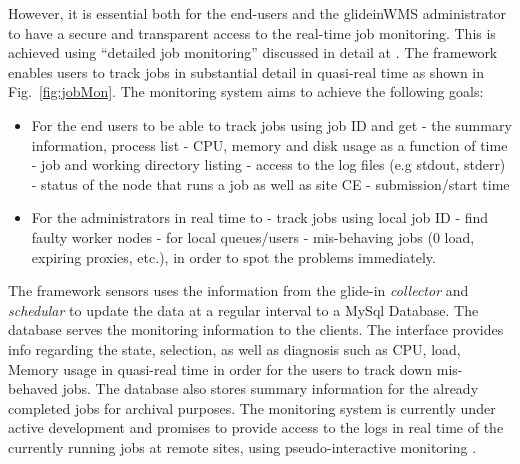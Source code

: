 \documentclass[a4paper]{jpconf}
\begin{document}
However, it is essential both for the end-users and the glideinWMS administrator to have 
a secure and transparent access to the real-time job monitoring. This is achieved using
``detailed job monitoring'' discussed in detail at \cite{bib:cms_jobmon}. The framework enables users to track jobs 
in substantial detail in quasi-real time as shown in Fig.~\ref{fig:jobMon}. The monitoring system aims to 
achieve the following goals:
\begin {itemize}
\item 
For the end users to be able to track jobs using job ID and get 
\subitem
- the summary information, process list
\subitem
- CPU, memory and disk usage as a function of time
\subitem
- job and working directory listing
\subitem
- access to the log files (e.g stdout, stderr)
\subitem
- status of the node that runs a job as well as site CE
\subitem
- submission/start time
\item
For the administrators in real time to
\subitem
 - track jobs using local job ID
\subitem
- find faulty worker nodes
\subitem
- for local queues/users
\subitem
- mis-behaving jobs (0 load, expiring proxies, etc.), in order to spot the problems immediately.
\end{itemize}
The framework sensors uses the information from the glide-in \emph{collector} and \emph{schedular} to
update the data at a regular interval to a MySql Database. The database serves the monitoring
information to the clients. The interface provides info regarding the state, selection, as well as 
diagnosis such as CPU, load, Memory usage in quasi-real time in order for the users to track down 
mis-behaved jobs. The database also stores summary information for the already completed jobs for archival 
purposes. The monitoring system is currently under active development and promises to provide access to 
the logs in real time of the currently running jobs at remote sites, using 
pseudo-interactive monitoring \cite{bib:pseudo_mon}.
\end{document}
